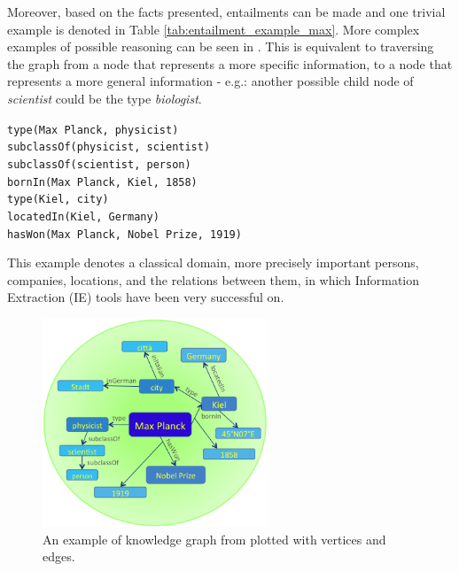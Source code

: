 \documentclass[11pt,a4paper,openright]{memoir}
\begin{document}
Moreover, based on the facts presented, entailments can be made and one trivial example is denoted in Table \ref{tab:entailment_example_max}. More complex examples of possible reasoning can be seen in \cite{Surdeanu:2011:CIE:2021153.2021155}. This is equivalent to traversing the graph from a node that represents a more specific information, to a node that represents a more general information - e.g.: another possible child node of \emph{scientist} could be the type \emph{biologist}.

\begin{table}[!htbp]
  \centering
  \RaggedRight
    \texttt{type(Max Planck, physicist)} \\
    \texttt{subclassOf(physicist, scientist)} \\
    \texttt{subclassOf(scientist, person)} \\
    \texttt{bornIn(Max Planck, Kiel, 1858)} \\
    \texttt{type(Kiel, city)} \\
    \texttt{locatedIn(Kiel, Germany)} \\
    \texttt{hasWon(Max Planck, Nobel Prize, 1919)} \\
  \caption[Some facts regarding Max Planck.]{Some facts regarding Max Planck, also depicted in Figure \ref{fig:yago_knowledge_graph}.}
  \label{tab:max_planck}
\end{table}

This example denotes a classical domain, more precisely important persons, companies, locations, and the relations between them, in which Information Extraction (IE) tools have been very successful on.

\begin{figure}[!htbp]
  \centering
    \includegraphics[width=0.6\textwidth]{./images/yago_graph}
  \caption[An example of knowledge graph plotted with vertices and edges.]{An example of knowledge graph from \cite{Suchanek2007} plotted with vertices and edges.}
  \label{fig:yago_knowledge_graph}
\end{figure}
\end{document}
